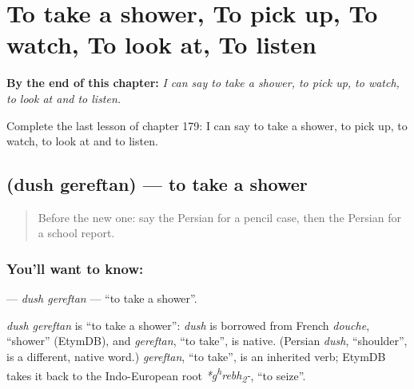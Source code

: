 
\chapter{To take a shower, To pick up, To watch, To look at, To listen}
\label{ch:fa-to-take-a-shower-to-pick-up-to-watch-to-look-at-to-listen}

\begin{chapteropening}
\textbf{By the end of this chapter:} \emph{I can say to take a shower, to pick up, to watch, to look at and to listen.}

Complete the last lesson of chapter 179: I can say to take a shower, to pick up, to watch, to look at and to listen.
\end{chapteropening}

\section[\texorpdfstring{\fa{دوش} \fa{گرفتن} (dush gereftan)}{دوش گرفتن (dush gereftan)}]{  (dush gereftan) — to take a shower}

\label{lesson:FA-C179-dush-gereftan}



\begin{quote}
Before the new one: say the Persian for a pencil case, then the Persian for a school report.
\end{quote}

\subsection*{You'll want to know:  }
\textbf{ } — \emph{dush gereftan} — \textquotedblleft{}to take a shower\textquotedblright{}.

\begin{cousinweb}
\emph{dush gereftan} is \textquotedblleft{}to take a shower\textquotedblright{}: \emph{dush} is borrowed from French \emph{douche}, \textquotedblleft{}shower\textquotedblright{} (EtymDB), and \emph{gereftan}, \textquotedblleft{}to take\textquotedblright{}, is native. (Persian \emph{dush}, \textquotedblleft{}shoulder\textquotedblright{}, is a different, native word.) \emph{gereftan}, \textquotedblleft{}to take\textquotedblright{}, is an inherited verb; EtymDB takes it back to the Indo-European root \emph{*g\textsuperscript{h}rebh\textsubscript{2}-}, \textquotedblleft{}to seize\textquotedblright{}.
\end{cousinweb}

